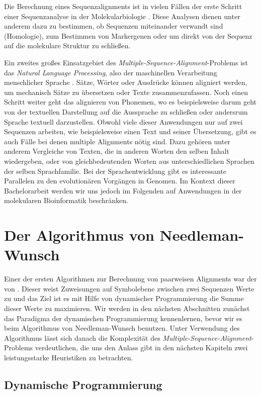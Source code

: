 Die Berechnung eines Sequenzalignments ist in vielen Fällen der erste Schritt einer Sequenzanalyse in der Molekularbiologie \cite{cpm10}. Diese Analysen dienen unter anderem dazu zu bestimmen, ob Sequenzen miteinander verwandt sind (Homologie), zum Bestimmen von Markergenen oder um direkt von der Sequenz auf die molekulare Struktur zu schließen. 

Ein zweites großes Einsatzgebiet des \emph{Multiple-Sequence-Alignment}-Problems ist das \emph{Natural Language Processing}, also der maschinellen Verarbeitung menschlicher Sprache \cite{s10}. Sätze, Wörter oder Ausdrücke können aligniert werden, um mechanisch Sätze zu übersetzen oder Texte zusammenzufassen. Noch einen Schritt weiter geht das alignieren von Phonemen, wo es beispielsweise darum geht von der textuellen Darstellung auf die Aussprache zu schließen oder andersrum Sprache textuell darzustellen. Obwohl viele dieser Anwendungen nur auf zwei Sequenzen arbeiten, wie beispielsweise einen Text und seiner Übersetzung, gibt es auch Fälle bei denen multiple Alignments nötig sind. Dazu gehören unter anderem Vergleiche von Texten, die in anderen Worten den selben Inhalt wiedergeben, oder von gleichbedeutenden Worten aus unterschiedlichen Sprachen der selben Sprachfamilie. Bei der Sprachentwicklung gibt es interessante Parallelen zu den evolutionären Vorgängen in Genomen. Im Kontext dieser Bachelorarbeit werden wir uns jedoch im Folgenden auf Anwendungen in der molekularen Bioinformatik beschränken.  

\section{Der Algorithmus von Needleman-Wunsch}

Einer der ersten Algorithmen zur Berechnung von paarweisen Alignments war der von \cite{nw70}. Dieser weist Zuweisungen auf Symbolebene zwischen zwei Sequenzen Werte zu und das Ziel ist es mit Hilfe von dynamischer Programmierung die Summe dieser Werte zu maximieren. Wir werden in den nächsten Abschnitten zunächst das Paradigma der dynamischen Programmierung kennenlernen, bevor wir es beim Algorithmus von Needleman-Wunsch benutzen. Unter Verwendung des Algorithmus lässt sich danach die Komplexität des \emph{Multiple-Sequence-Alignment}-Problems verdeutlichen, die uns den Anlass gibt in den nächsten Kapiteln zwei leistungsstarke Heuristiken zu betrachten.

\subsection{Dynamische Programmierung}

